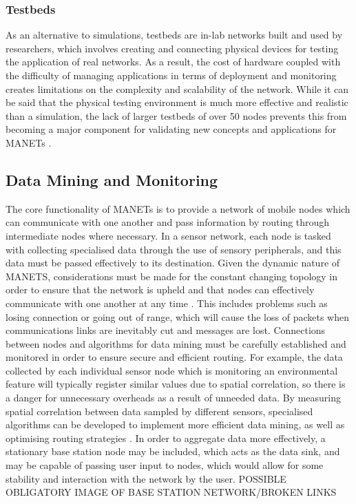\subsubsection{Testbeds}
As an alternative to simulations, testbeds are in-lab networks built and used by researchers, which involves creating and connecting physical devices for testing the application of real networks. As a result, the cost of hardware coupled with the difficulty of managing applications in terms of deployment and monitoring creates limitations on the complexity and scalability of the network. While it can be said that the physical testing environment is much more effective and realistic than a simulation, the lack of larger testbeds of over 50 nodes prevents this from becoming a major component for validating new concepts and applications for MANETs \cite{luchogie2006}.

\subsection{Data Mining and Monitoring}
The core functionality of MANETs is to provide a network of mobile nodes which can communicate with one another and pass information by routing through intermediate nodes where necessary. In a sensor network, each node is tasked with collecting specialised data through the use of sensory peripherals, and this data must be passed effectively to its destination. Given the dynamic nature of MANETS, considerations must be made for the constant changing topology in order to ensure that the network is upheld and that nodes can effectively communicate with one another at any time \cite{ramramathanjasonredi2012}. This includes problems such as losing connection or going out of range, which will cause the loss of packets when communications links are inevitably cut and messages are lost. 
Connections between nodes and algorithms for data mining must be carefully established and monitored in order to ensure secure and efficient routing. For example, the data collected by each individual sensor node which is monitoring an environmental feature will typically register similar values due to spatial correlation, so there is a danger for unnecessary overheads as a result of unneeded data. By measuring spatial correlation between data sampled by different sensors, specialised algorithms can be developed to implement more efficient data mining, as well as optimising routing strategies \cite{mayajie2011}. In order to aggregate data more effectively, a  stationary base station node may be included, which acts as the data sink, and may be capable of passing user input to nodes, which would allow for some stability and interaction with the network by the user. 
POSSIBLE OBLIGATORY IMAGE OF BASE STATION NETWORK/BROKEN LINKS

